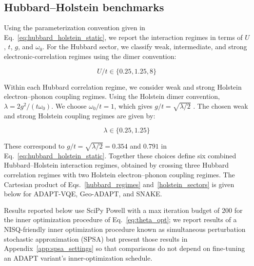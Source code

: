 \documentclass[
  reprint,
  amsmath,
  amssymb,
  aps,
  pra,
  nofootinbib,
  superscriptaddress,
  floatfix
]{revtex4-2}
\begin{document}

\subsection{Hubbard--Holstein benchmarks}
Using the parameterization convention given in Eq.~\eqref{eq:hubbard_holstein_static}, we report the interaction regimes in terms of \(U\), \(t\), \(g\), and \(\omega_0\).
For the Hubbard sector, we classify weak, intermediate, and strong electronic-correlation regimes using the dimer convention:

\begin{equation}
    U/t \in\{0.25,1.25,8\} \label{hubbard_regimes}
\end{equation}

Within each Hubbard correlation regime, we consider weak and strong Holstein electron--phonon coupling regimes. Using the Holstein dimer convention, \(\lambda=2g^2/(t\omega_0)\). We choose \(\omega_0/t=1\), which gives \(g/t=\sqrt{\lambda/2}\) \cite{Sakkinen2015HolsteinDimer}.
The chosen weak and strong Holstein coupling regimes are given by:

\begin{equation}
    \lambda\in\{0.25,1.25\} \label{holstein_sectors}
\end{equation}

These correspond to \(g/t=\sqrt{\lambda/2}=0.354\) and \(0.791\) in Eq.~\eqref{eq:hubbard_holstein_static}. Together these choices define six combined Hubbard--Holstein interaction regimes, obtained by crossing three Hubbard correlation regimes with two Holstein electron--phonon coupling regimes. The Cartesian product of Eqs.~\eqref{hubbard_regimes} and~\eqref{holstein_sectors} is given below for ADAPT-VQE, Geo-ADAPT, and SNAKE.


Results reported below use SciPy Powell with a max iteration budget of 200 for the inner optimization procedure of Eq.~\eqref{eq:theta_opt}; we report results of a NISQ-friendly inner optimization procedure known as simultaneous perturbation stochastic approximation (SPSA) but present those results in Appendix~\ref{app:spsa_settings} so that comparisons do not depend on fine-tuning an ADAPT variant's inner-optimization schedule.
\end{document}
